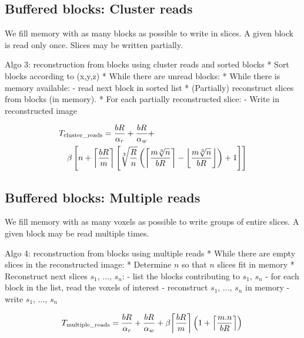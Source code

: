 \documentclass[10pt, conference, compsocconf]{IEEEtran}
\DeclarePairedDelimiter{\ceil}{\lceil}{\rceil}
\DeclarePairedDelimiter{\floor}{\lfloor}{\rfloor}
\begin{document}
\subsection{Buffered blocks: Cluster reads}

We fill memory with as many blocks as possible to write in slices. A
given block is read only once. Slices may be written partially.

Algo 3: reconstruction from blocks using cluster reads and sorted blocks
* Sort blocks according to (x,y,z)
* While there are unread blocks:
  * While there is memory available:
    - read next block in sorted list
  * (Partially) reconstruct slices from blocks (in memory).
  * For each partially reconstructed slice:
    - Write in reconstructed image

    \begin{equation}
      \begin{multlined}
  T_\mathrm{cluster\_reads} = \frac{bR}{\alpha_r}+\frac{bR}{\alpha_w} +\\
  \beta
  \left[n+ 
  \ceil*{\frac{bR}{m}} \left[
           \sqrt[3]{\frac{R}{n}} \left(
              \ceil*{\frac{m\sqrt[3]{n}}{bR}} - \floor*{\frac{m\sqrt[3]{n}}{bR}}
           \right)+1
             \right]
             \right]
             \end{multlined}
\end{equation}
    
\subsection{Buffered blocks: Multiple reads}

We fill memory with as many voxels as possible to write groups of
entire slices. A given block may be read multiple times.

Algo 4: reconstruction from blocks using multiple reads
* While there are empty slices in the reconstructed image:
  * Determine $n$ so that $n$ slices fit in memory
  * Reconstruct next slices $s_1$, ...,  $s_n$:
     - list the blocks contributing to $s_1$, $s_n$
     - for each block in the list, read the voxels of interest
     - reconstruct $s_1$, ..., $s_n$ in memory
     - write $s_1$, ..., $s_n$

     \begin{equation}
       T_\mathrm{multiple\_reads}= \frac{bR}{\alpha_r}+\frac{bR}{\alpha_w} + \beta\ceil*{\frac{bR}{m}}\left(1+ \ceil*{\frac{m.n}{bR}}\right)\\
\end{equation}
     
\end{document}
